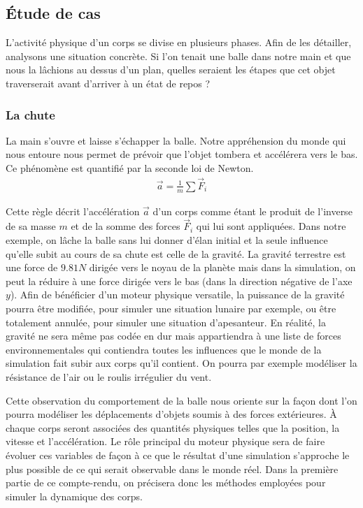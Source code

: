 \subsection{\'Etude de cas}

L'activité physique d'un corps se divise en plusieurs phases. Afin de
les détailler, analysons une situation concrète. Si l'on tenait une
balle dans notre main et que nous la lâchions au dessus d'un plan,
quelles seraient les étapes que cet objet traverserait avant d'arriver
à un état de repos ?

\subsubsection{La chute}

La main s'ouvre et laisse s'échapper la balle. Notre appréhension du
monde qui nous entoure nous permet de prévoir que l'objet tombera et
accélérera vers le bas. Ce phénomène est quantifié par la seconde loi
de Newton.
\begin{align*}
  \vec{a} = \frac{1}{m} \sum{\vec{F}_i}
\end{align*}

Cette règle décrit l'accélération $\vec{a}$ d'un corps comme étant le
produit de l'inverse de sa masse $m$ et de la somme des forces
$\vec{F}_i$ qui lui sont appliquées. Dans notre exemple, on lâche la
balle sans lui donner d'élan initial et la seule influence qu'elle
subit au cours de sa chute est celle de la gravité. La gravité
terrestre est une force de $9.81 N$ dirigée vers le noyau de la
planète mais dans la simulation, on peut la réduire à une force
dirigée vers le bas (dans la direction négative de l'axe $y$). Afin de
bénéficier d'un moteur physique versatile, la puissance de la gravité
pourra être modifiée, pour simuler une situation lunaire par exemple,
ou être totalement annulée, pour simuler une situation
d'apesanteur. En réalité, la gravité ne sera même pas codée \og en dur
\fg{} mais appartiendra à une liste de forces environnementales qui
contiendra toutes les influences que le monde de la simulation fait
subir aux corps qu'il contient. On pourra par exemple modéliser la
résistance de l'air ou le roulis irrégulier du vent.

Cette observation du comportement de la balle nous oriente sur la
façon dont l'on pourra modéliser les déplacements d'objets soumis à
des forces extérieures. \`A chaque corps seront associées des
quantités physiques telles que la position, la vitesse et
l'accélération. Le rôle principal du moteur physique sera de faire
évoluer ces variables de façon à ce que le résultat d'une simulation
s'approche le plus possible de ce qui serait observable dans le monde
réel. Dans la première partie de ce compte-rendu, on précisera donc
les méthodes employées pour simuler la dynamique des corps.

